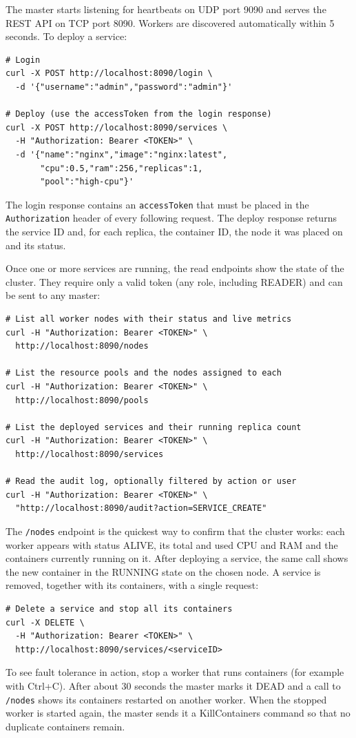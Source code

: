 The master starts listening for heartbeats on UDP port 9090 and serves the REST API on TCP port 8090. Workers are discovered automatically within 5 seconds. To deploy a service:

\begin{verbatim}
# Login
curl -X POST http://localhost:8090/login \
  -d '{"username":"admin","password":"admin"}'

# Deploy (use the accessToken from the login response)
curl -X POST http://localhost:8090/services \
  -H "Authorization: Bearer <TOKEN>" \
  -d '{"name":"nginx","image":"nginx:latest",
       "cpu":0.5,"ram":256,"replicas":1,
       "pool":"high-cpu"}'
\end{verbatim}

The login response contains an \texttt{accessToken} that must be placed in the \texttt{Authorization} header of every following request. The deploy response returns the service ID and, for each replica, the container ID, the node it was placed on and its status.

Once one or more services are running, the read endpoints show the state of the cluster. They require only a valid token (any role, including READER) and can be sent to any master:

\begin{verbatim}
# List all worker nodes with their status and live metrics
curl -H "Authorization: Bearer <TOKEN>" \
  http://localhost:8090/nodes

# List the resource pools and the nodes assigned to each
curl -H "Authorization: Bearer <TOKEN>" \
  http://localhost:8090/pools

# List the deployed services and their running replica count
curl -H "Authorization: Bearer <TOKEN>" \
  http://localhost:8090/services

# Read the audit log, optionally filtered by action or user
curl -H "Authorization: Bearer <TOKEN>" \
  "http://localhost:8090/audit?action=SERVICE_CREATE"
\end{verbatim}

The \texttt{/nodes} endpoint is the quickest way to confirm that the cluster works: each worker appears with status ALIVE, its total and used CPU and RAM and the containers currently running on it. After deploying a service, the same call shows the new container in the RUNNING state on the chosen node. A service is removed, together with its containers, with a single request:

\begin{verbatim}
# Delete a service and stop all its containers
curl -X DELETE \
  -H "Authorization: Bearer <TOKEN>" \
  http://localhost:8090/services/<serviceID>
\end{verbatim}

To see fault tolerance in action, stop a worker that runs containers (for example with Ctrl+C). After about 30 seconds the master marks it DEAD and a call to \texttt{/nodes} shows its containers restarted on another worker. When the stopped worker is started again, the master sends it a KillContainers command so that no duplicate containers remain.
